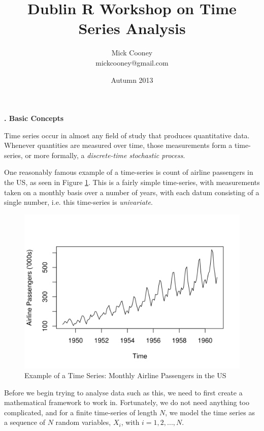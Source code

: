 \documentclass[10pt, a4paper]{article}
\title{Dublin R Workshop on Time Series Analysis}
\author{Mick Cooney\\mickcooney@gmail.com}
\date{Autumn 2013}
\newcounter{wssection}
\newcommand{\worksheetsection}[1]{
\vspace{10mm}
\stepcounter{wssection}
\noindent \Large \textbf{\thewssection. #1} \normalsize
\vspace{3mm}
}
\begin{document}
\maketitle




\worksheetsection{Basic Concepts}

\noindent
Time series occur in almost any field of study that produces
quantitative data. Whenever quantities are measured over time, those
measurements form a time-series, or more formally, a
\emph{discrete-time stochastic process}.

One reasonably famous example of a time-series is count of airline
passengers in the US, as seen in Figure \ref{fig1}. This is a fairly
simple time-series, with measurements taken on a monthly basis over a
number of years, with each datum consisting of a single number,
i.e. this time-series is \emph{univariate}.

\begin{figure}[h]
\begin{center}
\includegraphics{airline_passengers_plot.png}
\caption{\label{fig1}
Example of a Time Series: Monthly Airline Passengers in the US}
\end{center}
\end{figure}


Before we begin trying to analyse data such as this, we need to first
create a mathematical framework to work in. Fortunately, we do not
need anything too complicated, and for a finite time-series of length
$N$, we model the time series as a sequence of $N$ random variables,
$X_i$, with $i = 1, 2, ..., N$.
\end{document}
